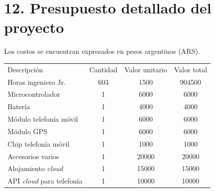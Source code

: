 \documentclass[
11pt, %
]{charter}
\begin{document}
\section{12. Presupuesto detallado del proyecto}
\label{sec:presupuesto}

Los costos se encuentran expresados en pesos argentinos (ARS).

\begin{table}[htpb]
\centering
\begin{tabularx}{\linewidth}{@{}|X|c|r|r|@{}}
\hline
\rowcolor[HTML]{C0C0C0} 
\multicolumn{4}{|c|}{\cellcolor[HTML]{C0C0C0}COSTOS DIRECTOS} \\ \hline
\rowcolor[HTML]{C0C0C0} 
Descripción &
  \multicolumn{1}{c|}{\cellcolor[HTML]{C0C0C0}Cantidad} &
  \multicolumn{1}{c|}{\cellcolor[HTML]{C0C0C0}Valor unitario} &
  \multicolumn{1}{c|}{\cellcolor[HTML]{C0C0C0}Valor total} \\ \hline
 Horas ingeniero Jr. &
  \multicolumn{1}{c|}{603} &
  \multicolumn{1}{c|}{1500} &
  \multicolumn{1}{c|}{904500} \\ \hline
 Microcontrolador &
  \multicolumn{1}{c|}{1} &
  \multicolumn{1}{c|}{6000} &
  \multicolumn{1}{c|}{6000} \\ \hline
 Batería &
  \multicolumn{1}{c|}{1} &
  \multicolumn{1}{c|}{4000} &
  \multicolumn{1}{c|}{4000} \\ \hline
  Módulo telefonía móvil &
  \multicolumn{1}{c|}{1} &
  \multicolumn{1}{c|}{6000} &
  \multicolumn{1}{c|}{6000} \\ \hline
  
  Módulo GPS &
  \multicolumn{1}{c|}{1} &
  \multicolumn{1}{c|}{6000} &
  \multicolumn{1}{c|}{6000} \\ \hline
  
  Chip telefonía móvil &
  \multicolumn{1}{c|}{1} &
  \multicolumn{1}{c|}{1000} &
  \multicolumn{1}{c|}{1000} \\ \hline
  
  Accesorios varios &
  \multicolumn{1}{c|}{1} &
  \multicolumn{1}{c|}{20000} &
  \multicolumn{1}{c|}{20000} \\ \hline
  
  Alojamiento \textit{cloud} &
  \multicolumn{1}{c|}{1} &
  \multicolumn{1}{c|}{15000} &
  \multicolumn{1}{c|}{15000} \\ \hline
  
  API \textit{cloud} para telefonía &
  \multicolumn{1}{c|}{1} &
  \multicolumn{1}{c|}{10000} &
  \multicolumn{1}{c|}{10000} \\ \hline
  

\end{tabularx}
\end{table}
\end{document}
